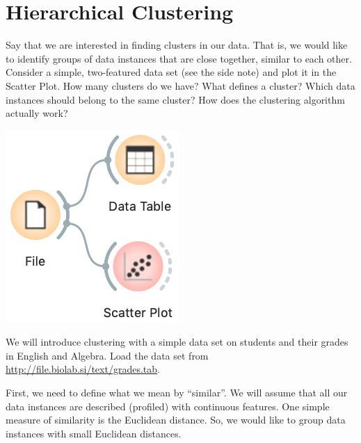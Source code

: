 \chapter{Hierarchical Clustering}
\label{ch:hierarchical_clustering}

Say that we are interested in finding clusters in our data. That is, we would like to identify groups of data instances that are close together, similar to each other. Consider a simple, two-featured data set (see the side note) and plot it in the Scatter Plot. How many clusters do we have? What defines a cluster? Which data instances should belong to the same cluster? How does the clustering algorithm actually work?

\begin{marginfigure}
    \includegraphics[scale=0.4]{graphics/ch-hierarchical_clustering/workflow_scatterplot.png}
    \caption{We will introduce clustering with a simple data set on students and their grades in English and Algebra.
Load the data set from \url{http://file.biolab.si/text/grades.tab}.}
\end{marginfigure}

First, we need to define what we mean by ``similar''. We will assume that all our data instances are described (profiled) with continuous features. One simple measure of similarity is the Euclidean distance. So, we would like to group data instances with small Euclidean distances.

